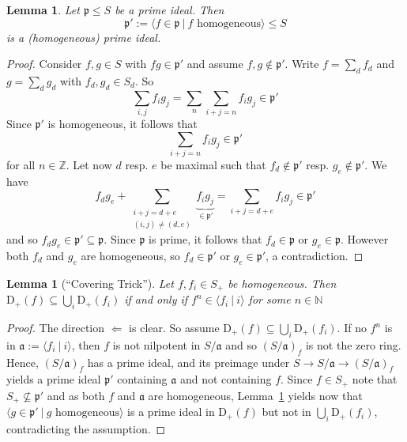 \documentclass{scrartcl}
\newcommand{\N}{\mathbb{N}}
\newcommand{\Z}{\mathbb{Z}}
\newcommand{\D}[1]{\mathrm{D}_+(#1)}
\newcommand{\p}{\mathfrak{p}}
\renewcommand{\a}{\mathfrak{a}}
\newtheorem{lemma}[subsection]{Lemma}
\theoremstyle{definition}
\begin{document}
\begin{lemma}
    \label{prop:homogeneous_part_prime}
    Let $\p \leq S$ be a prime ideal.
    Then
    \begin{equation*}
        \p' := \langle f \in \p \ | \ \text{$f$ homogeneous} \rangle \leq S
    \end{equation*}
    is a (homogeneous) prime ideal.
\end{lemma}
\begin{proof}
    Consider $f, g \in S$ with $f g \in \p'$ and assume $f, g \notin \p'$.
    Write $f = \sum_d f_d$ and $g = \sum_d g_d$ with $f_d, g_d \in S_d$.
    So
    \begin{equation*}
        \sum_{i, j} f_i g_j = \sum_n \sum_{i + j = n} f_i g_j \in \p'
    \end{equation*}
    Since $\p'$ is homogeneous, it follows that
    \begin{equation*}
        \sum_{i + j = n} f_i g_j \in \p'
    \end{equation*}
    for all $n \in \Z$.
    Let now $d$ resp. $e$ be maximal such that $f_d \notin \p'$ resp. $g_e \notin \p'$.
    We have
    \begin{equation*}
        f_d g_e + \sum_{\substack{i + j = d + e\\(i, j) \neq (d, e)}} \underbrace{f_i g_j}_{\in \p'} = \sum_{i + j = d + e} f_i g_j \in \p'
    \end{equation*}
    and so $f_d g_e \in \p' \subseteq \p$.
    Since $\p$ is prime, it follows that $f_d \in \p$ or $g_e \in \p$.
    However both $f_d$ and $g_e$ are homogeneous, so $f_d \in \p'$ or $g_e \in \p'$, a contradiction.
\end{proof}
\begin{lemma}[``Covering Trick'']
    \label{prop:covering_trick}
    Let $f, f_i \in S_+$ be homogeneous.
    Then $\D{f} \subseteq \bigcup_i \D{f_i}$ if and only if $f^n \in \langle f_i \ | \ i \rangle$ for some $n \in \N$
\end{lemma}
\begin{proof}
    The direction $\Leftarrow$ is clear.
    So assume $\D{f} \subseteq \bigcup_i \D{f_i}$.
    If no $f^n$ is in $\a := \langle f_i \ | \ i \rangle$, then $f$ is not nilpotent in $S/\a$ and so $(S/\a)_f$ is not the zero ring.
    Hence, $(S/\a)_f$ has a prime ideal, and its preimage under $S \to S/\a \to (S/\a)_f$ yields a prime ideal $\p'$ containing $\a$ and not containing $f$.
    Since $f \in S_+$ note that $S_+ \not\subseteq \p'$ and as both $f$ and $\a$ are homogeneous, Lemma~\ref{prop:homogeneous_part_prime} yields now that $\langle g \in \p' \ | \ \text{$g$ homogeneous} \rangle$ is a prime ideal in $\D{f}$ but not in $\bigcup_i \D{f_i}$, contradicting the assumption.
\end{proof}
\end{document}
